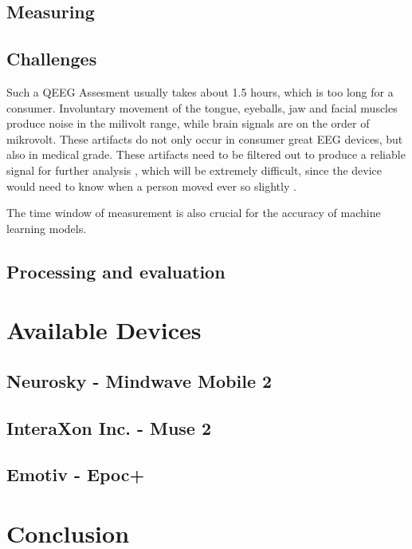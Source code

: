 \documentclass{llncs} %
\begin{document}
\subsection{Measuring}
\subsection{Challenges}
Such a QEEG Assesment usually takes about 1.5 hours, which is too long for a consumer.
Involuntary movement of the tongue, eyeballs, jaw and facial muscles produce noise in the milivolt range, while brain signals are on 
the order of mikrovolt. These artifacts do not only occur in consumer great EEG devices, but also in medical grade.
These artifacts need to be filtered out to produce a reliable signal for further analysis \cite{Bashivan: et al}, which will be extremely difficult, since the device would need to know when a person moved ever so slightly \cite{Hammond}.

The time window of measurement is also crucial for the accuracy of machine learning models.
\subsection{Processing and evaluation}
\cite{Lotte}
\section{Available Devices}
\subsection{Neurosky - Mindwave Mobile 2}
\subsection{InteraXon Inc. - Muse 2}
\subsection{Emotiv - Epoc+}
\section{Conclusion}
\end{document}
